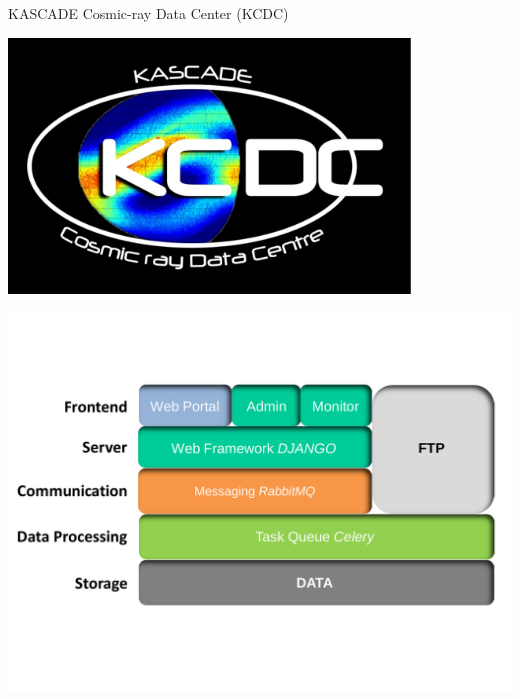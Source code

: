 \begin{frame}{KASCADE Cosmic-ray Data Center (KCDC)}
 \begin{minipage}[c]{0.49\textwidth}
 \begin{center}
   \includegraphics[width=0.8\textwidth]{pics/KCDC-Logo.pdf}
 \end{center}
\end{minipage}
\begin{minipage}[c]{0.49\textwidth}
 \begin{center}
 \hspace{10em}
  \includegraphics[width=1.1\textwidth]{pics/KCDC-IT-Structure.pdf}
 \end{center}
\end{minipage}
\end{frame}



